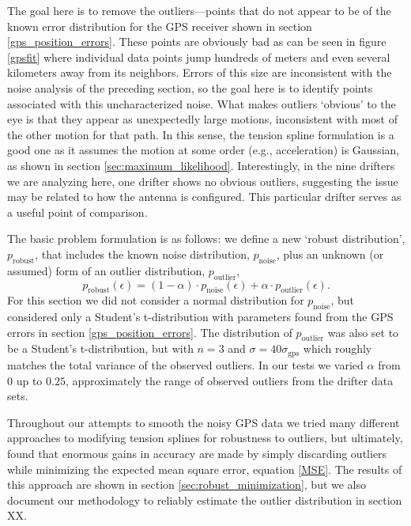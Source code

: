 \documentclass[10pt,journal]{IEEEtran}
\begin{document}
The goal here is to remove the outliers---points that do not appear to be of the known error distribution for the GPS receiver shown in section \ref{gps_position_errors}. These points are obviously bad as can be seen in figure \ref{gpsfit} where individual data points jump hundreds of meters and even several kilometers away from its neighbors. Errors of this size are inconsistent with the noise analysis of the preceding section, so the goal here is to identify points associated with this uncharacterized noise. What makes outliers `obvious' to the eye is that they appear as unexpectedly large motions, inconsistent with most of the other motion for that path. In this sense, the tension spline formulation is a good one as it assumes the motion at some order (e.g., acceleration) is Gaussian, as shown in section \ref{sec:maximum_likelihood}. Interestingly, in the nine drifters we are analyzing here, one drifter shows no obvious outliers, suggesting the issue may be related to how the antenna is configured. This particular drifter serves as a useful point of comparison.

The basic problem formulation is as follows: we define a new `robust distribution', $p_{\textrm{robust}}$, that includes the known noise distribution, $p_{\textrm{noise}}$, plus an unknown (or assumed) form of an outlier distribution, $p_{\textrm{outlier}}$,
\begin{equation}
\label{robust_pdf}
    p_{\textrm{robust}}(\epsilon) = (1-\alpha) \cdot p_{\textrm{noise}}(\epsilon) + \alpha \cdot  p_{\textrm{outlier}}(\epsilon).
\end{equation}
For this section we did not consider a normal distribution for $p_{\textrm{noise}}$, but considered only a Student's t-distribution with parameters found from the GPS errors in section \ref{gps_position_errors}. The distribution of $ p_{\textrm{outlier}}$ was also set to be a Student's t-distribution, but with $n=3$ and $\sigma=40\sigma_\textrm{gps}$ which roughly matches the total variance of the observed outliers. In our tests we varied $\alpha$ from 0 up to $0.25$, approximately the range of observed outliers from the drifter data sets.

Throughout our attempts to smooth the noisy GPS data we tried many different approaches to modifying tension splines for robustness to outliers, but ultimately, found that enormous gains in accuracy are made by simply discarding outliers while minimizing the expected mean square error, equation \ref{MSE}. The results of this approach are shown in section \ref{sec:robust_minimization}, but we also document our methodology to reliably estimate the outlier distribution in section XX.
\end{document}
